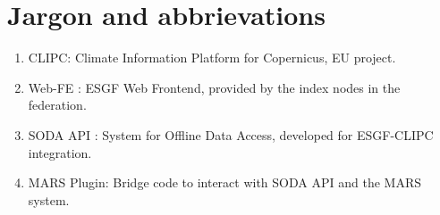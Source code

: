 \documentclass[oneside,12pt]{memoir}
\def\phname{SODA API{ }}
\begin{document}
\chapter{Jargon and abbrievations}
\begin{enumerate}
\item CLIPC: Climate Information Platform for Copernicus, EU project.
\item Web-FE : ESGF Web Frontend, provided by the index nodes in the federation.
\item \phname: System for Offline Data Access, developed for ESGF-CLIPC integration.
\item MARS Plugin: Bridge code to interact with \phname and the MARS system.
\end{enumerate}
\hypertarget{mymarker}{}
\printindex
\end{document}
